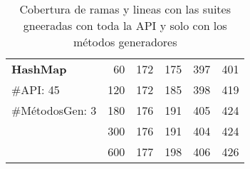 \begin{table}[H]
{\begin{tabular}{l |r |cc |cc }
 \hline

\multirow{1}{*}{\textbf{HashMap}} 
& 60 & 172 & 175 & 397& 401 \\
  {\scriptsize \#API: 45}& 120 & 172 & 185  & 398 & 419 \\
  {\scriptsize \#MétodosGen: 3}& 180 &176 & 191  & 405 & 424  \\
    & 300 & 176 & 191 &404 &  424 \\
  & 600 & 177 & 198  &406 & 426  \\
\hline
 
 \end{tabular}%
}
\caption{Cobertura de ramas y lineas con las suites gneeradas con toda la API y solo con los métodos generadores}
\label{tab:results-coverage}
 
\end{table}